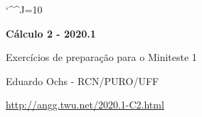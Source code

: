 \documentclass[oneside,12pt]{article}
\begin{document}
\catcode`\^^J=10

\pu

\long{}
\long{}
\long{}
\long{}
\long{}
\long{}
\long{}
\long{}
\long{}
\long{}

\long{}
\long{}

\def\frown{\ensuremath{{=}{(}}}
\def\True {\mathbf{V}}
\def\False{\mathbf{F}}

\def\drafturl{http://angg.twu.net/LATEX/2020-1-C2.pdf}
\def\drafturl{http://angg.twu.net/2020.1-C2.html}
\def\draftfooter{\tiny \href{\drafturl}{\jobname{}} \ColorBrown{\shorttoday{} \hours}}



%

\thispagestyle{empty}

\begin{center}

\vspace*{1.2cm}

{\bf \Large Cálculo 2 - 2020.1}

\bsk

Exercícios de preparação para o Miniteste 1

\bsk

Eduardo Ochs - RCN/PURO/UFF

\url{http://angg.twu.net/2020.1-C2.html}

\end{center}

\newpage
\end{document}
